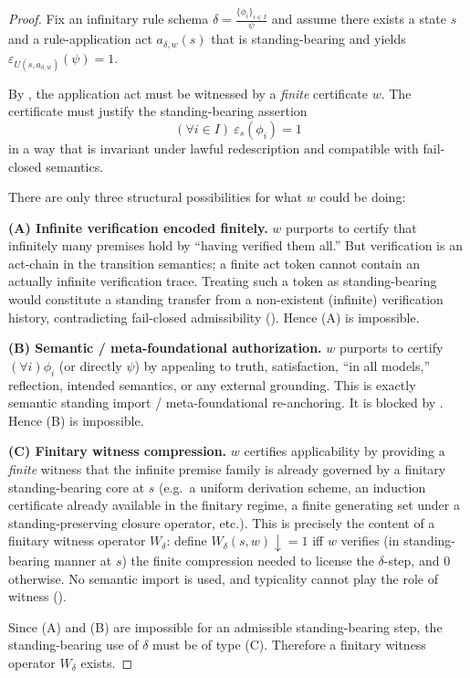 \documentclass[11pt]{article}
\theoremstyle{definition}
\begin{document}
\begin{proof}
Fix an infinitary rule schema $\delta=\frac{\{\phi_i\}_{i\in I}}{\psi}$ and assume there exists a
state $s$ and a rule-application act $a_{\delta,w}(s)$ that is standing-bearing and yields
$\varepsilon_{U(s,a_{\delta,w})}(\psi)=1$.

By , the application act must be witnessed by a \emph{finite}
certificate $w$. The certificate must justify the standing-bearing assertion
\[
(\forall i\in I)\ \varepsilon_s(\phi_i)=1
\]
in a way that is invariant under lawful redescription and compatible with fail-closed semantics.

There are only three structural possibilities for what $w$ could be doing:

\medskip
\noindent\textbf{(A) Infinite verification encoded finitely.}
$w$ purports to certify that infinitely many premises hold by ``having verified them all.''
But verification is an act-chain in the transition semantics; a finite act token cannot contain an
actually infinite verification trace.
Treating such a token as standing-bearing would constitute a standing transfer from a non-existent
(infinite) verification history, contradicting fail-closed admissibility
().
Hence (A) is impossible.

\medskip
\noindent\textbf{(B) Semantic / meta-foundational authorization.}
$w$ purports to certify $(\forall i)\phi_i$ (or directly $\psi$) by appealing to truth,
satisfaction, ``in all models,'' reflection, intended semantics, or any external grounding.
This is exactly semantic standing import / meta-foundational re-anchoring.
It is blocked by .
Hence (B) is impossible.

\medskip
\noindent\textbf{(C) Finitary witness compression.}
$w$ certifies applicability by providing a \emph{finite} witness that the infinite premise family is
already governed by a finitary standing-bearing core at $s$ (e.g.\ a uniform derivation scheme,
an induction certificate already available in the finitary regime, a finite generating set under a
standing-preserving closure operator, etc.).
This is precisely the content of a finitary witness operator $W_\delta$:
define $W_\delta(s,w)\downarrow=1$ iff $w$ verifies (in standing-bearing manner at $s$) the finite
compression needed to license the $\delta$-step, and $0$ otherwise.
No semantic import is used, and typicality cannot play the role of witness ().

Since (A) and (B) are impossible for an admissible standing-bearing step, the standing-bearing use
of $\delta$ must be of type (C). Therefore a finitary witness operator $W_\delta$ exists.
\end{proof}
\end{document}
